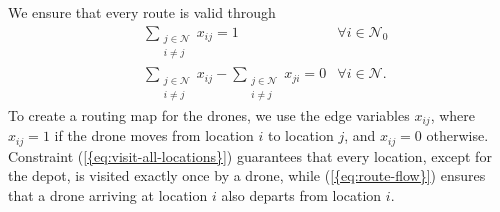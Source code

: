 \documentclass[journal]{IEEEtran}
\begin{document}
We ensure that every route is valid through
\begin{subequations}
\label{eq:flow-constraints}
\begin{align}
& {\ensuremath{\sum_{\substack {{j} \in {\ensuremath{\mathcal{N}}} \\ {i} \neq {j}}}}} {\ensuremath{x_{{i} {j}}}} = 1 & {\ensuremath{\forall {i} \in {\ensuremath{{\ensuremath{\mathcal{N}}}_{0}}}}} \label{eq:visit-all-locations} \\
& {\ensuremath{\sum_{\substack {{j} \in {\ensuremath{\mathcal{N}}} \\ {i} \neq {j}}}}} {\ensuremath{x_{{i} {j}}}} - {\ensuremath{\sum_{\substack {{j} \in {\ensuremath{\mathcal{N}}} \\ {i} \neq {j}}}}} {\ensuremath{x_{{j} {i}}}} = 0 & {\ensuremath{\forall {i} \in {\ensuremath{\mathcal{N}}}}}. \label{eq:route-flow}
\end{align}
\end{subequations}
To create a routing map for the drones, we use the edge variables ${\ensuremath{x_{{i} {j}}}}$, where ${\ensuremath{x_{{i} {j}}}} = 1$ if the drone moves from location $i$ to location $j$, and ${\ensuremath{x_{{i} {j}}}} = 0$ otherwise. Constraint {(\ref{{eq:visit-all-locations}})} guarantees that every location, except for the depot, is visited exactly once by a drone, while {(\ref{{eq:route-flow}})} ensures that a drone arriving at location $i$ also departs from location $i$.
 
\end{document}
